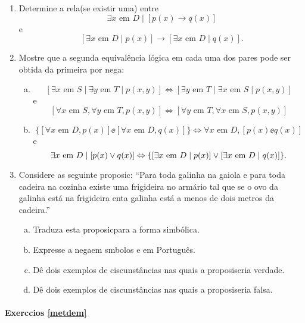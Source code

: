 \begin{enumerate}[{\bf 1.}]
\item Determine a rela\cao (se existir uma) entre
\[
\exists x \textrm{ em } D \mid  [p(x)\to q(x)]
\]
e
\[
[\exists x \textrm{ em } D \mid  p(x)]\to[\exists x \textrm{ em } D \mid  q(x)].
\]

\item Mostre que a segunda equival\^encia l\'ogica em cada uma dos pares pode ser obtida da primeira por nega\caoi: 
\begin{enumerate}[a)]
\item 
\[
[\exists x \textrm{ em } S \mid  \exists y \textrm{ em } T \mid  p(x,y)]\Leftrightarrow[\exists y \textrm{ em } T \mid  \exists x \textrm{ em } S \mid  p(x,y)]
\]
e
\[
[\forall x \textrm{ em } S, \forall y \textrm{ em } T, p(x,y)]\Leftrightarrow[\forall y \textrm{ em } T, \forall x \textrm{ em } S, p(x,y)]
\]

\item 
\[
\{[\forall x \textrm{ em } D, p(x)]\ee[\forall x \textrm{ em } D, q(x)]\}\Leftrightarrow \forall x \textrm{ em } D, [p(x)\ee q(x)]
\]
e
\[
\exists x \textrm{ em } D \mid  [p(x)\vee q(x)]\Leftrightarrow\{[\exists x \textrm{ em } D \mid  p(x)]\vee[\exists x \textrm{ em } D \mid  q(x)]\}.
\]
\end{enumerate}

\item Considere as seguinte proposic\aoi: ``Para toda galinha na gaiola e para toda cadeira na cozinha existe uma frigideira no arm\'ario tal que se o ovo da galinha est\'a na frigideira ent\ao a galinha est\'a a menos de dois metros da cadeira.''
\begin{enumerate}[a)]
\item Traduza esta proposic\ao para a forma simb\'olica.
\item Expresse a nega\cao em s\ih mbolos e em Portugu\^es.
\item D\^e dois exemplos de ciscunst\^ancias nas quais a proposi\cao seria verdade.
\item D\^e dois exemplos de ciscunst\^ancias nas quais a proposi\cao seria falsa.
\end{enumerate}
\end{enumerate}
\paragraph{Exerc\ih cios \ref{metdem}}

